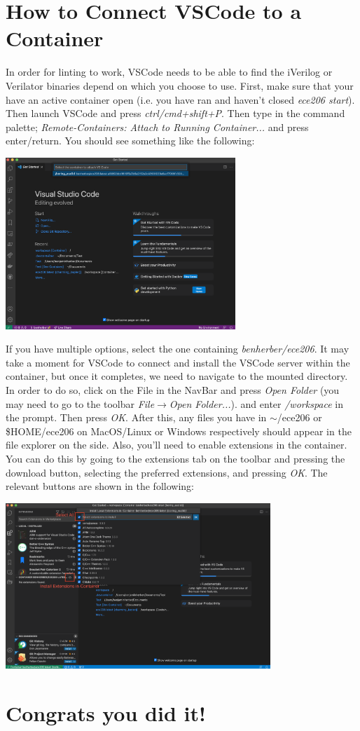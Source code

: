 \documentclass[11pt, letterpaper, titlepage, oneside]{memoir}
\begin{document}
    \section*{How to Connect VSCode to a Container}
        In order for linting to work, VSCode needs to be able to find the iVerilog or Verilator binaries depend on which you choose to use. First, make sure that your have an active container open (i.e. you have ran and haven't closed \textit{ece206 start}). Then launch VSCode and press \textit{ctrl/cmd+shift+P}. Then type in the command palette; \textit{Remote-Containers: Attach to Running Container...} and press enter/return. You should see something like the following:
        \begin{center}
                \includegraphics[width=0.65\textwidth]{./images/container_selection.png}
        \end{center}
        If you have multiple options, select the one containing \textit{benherber/ece206}. It may take a moment for VSCode to connect and install the VSCode server within the container, but once it completes, we need to navigate to the mounted directory. In order to do so, click on the File in the NavBar and press \textit{Open Folder} (you may need to go to the toolbar \textit{File}$\rightarrow$\textit{Open Folder...}). and enter \textit{/workspace} in the prompt. Then press \textit{OK}. After this, any files you have in $\sim$/ece206 or \$HOME/ece206 on MacOS/Linux or Windows respectively should appear in the file explorer on the side. Also, you'll need to enable extensions in the container. You can do this by going to the extensions tab on the toolbar and pressing the download button, selecting the preferred extensions, and pressing \textit{OK}. The relevant buttons are shown in the following:
        \begin{center}
                \includegraphics[width=0.75\textwidth]{./images/install_container_ext.png}
        \end{center}

    \section*{Congrats you did it!}
\end{document}
